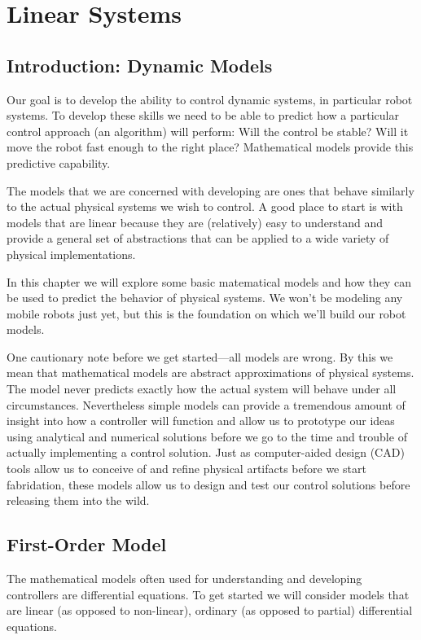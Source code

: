\chapter{Linear Systems}\label{c:linsys}
\section{Introduction: Dynamic Models}
Our goal is to develop the ability to control dynamic systems, in particular robot systems.  To develop these skills we need to be able to predict how a particular control approach (an algorithm) will perform: Will the control be stable?  Will it move the robot fast enough to the right place?  Mathematical models provide this predictive capability.  

The models that we are concerned with developing are ones that behave similarly to the actual physical systems we wish to control.  A good place to start is with models that are linear because they are (relatively) easy to understand and provide a general set of abstractions that can be applied to a wide variety of physical implementations.

In this chapter we will explore some basic matematical models and how they can be used to predict the behavior of physical systems.  We won't be modeling any mobile robots just yet, but this is the foundation on which we'll build our robot models.

One cautionary note before we get started---all models are wrong.  By this we mean that mathematical models are abstract approximations of physical systems.  The model never predicts exactly how the actual system will behave under all circumstances.  Nevertheless simple models can provide a tremendous amount of insight into how a controller will function and allow us to prototype our ideas using analytical and numerical solutions before we go to the time and trouble of actually implementing a control solution.  Just as computer-aided design (CAD) tools allow us to conceive of and refine physical artifacts before we start fabridation, these models allow us to design and test our control solutions before releasing them into the wild.

\section{First-Order Model}
The mathematical models often used for understanding and developing controllers are differential equations.  To get started we will consider models that are linear (as opposed to non-linear), ordinary (as opposed to partial) differential equations.  

